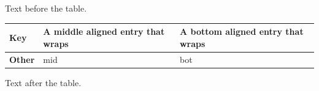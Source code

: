 \documentclass{article}
\begin{document}
Text before the table.

\begin{tabular}{|>{\bfseries}l|m{2.5cm}|b{2.5cm}|}\hline Key & A middle aligned entry that wraps & A bottom aligned entry that wraps\\\hline Other & mid & bot\\\hline\end{tabular}

Text after the table.
\end{document}
